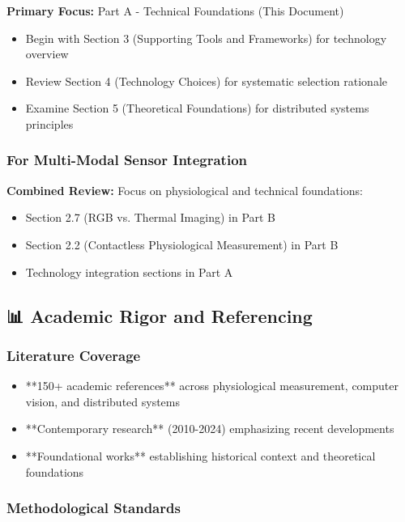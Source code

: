 \documentclass[12pt,a4paper]{article}
\begin{document}
\textbf{Primary Focus:} Part A - Technical Foundations (This Document)

\begin{itemize}
\item Begin with Section 3 (Supporting Tools and Frameworks) for technology overview
\item Review Section 4 (Technology Choices) for systematic selection rationale
\item Examine Section 5 (Theoretical Foundations) for distributed systems principles

\end{itemize}
\subsubsection{For Multi-Modal Sensor Integration}

\textbf{Combined Review:} Focus on physiological and technical foundations:

\begin{itemize}
\item Section 2.7 (RGB vs. Thermal Imaging) in Part B
\item Section 2.2 (Contactless Physiological Measurement) in Part B
\item Technology integration sections in Part A

\end{itemize}
\subsection{📊 Academic Rigor and Referencing}

\subsubsection{Literature Coverage}

\begin{itemize}
\item **150+ academic references** across physiological measurement, computer vision, and distributed systems
\item **Contemporary research** (2010-2024) emphasizing recent developments
\item **Foundational works** establishing historical context and theoretical foundations

\end{itemize}
\subsubsection{Methodological Standards}
\end{document}
